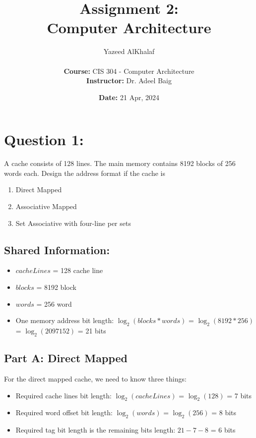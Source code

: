 \documentclass[a4paper]{article}
\title{\textbf{Assignment 2:\\Computer Architecture}}
\author{
    Yazeed AlKhalaf\\
    \\
    \textbf{Course:} CIS 304 - Computer Architecture\\
    \textbf{Instructor:} Dr. Adeel Baig
}
\date{\textbf{Date:} 21 Apr, 2024}
\begin{document}
\maketitle

\newpage

\tableofcontents

\newpage

\section{Question 1:}

A cache consists of 128 lines. The main memory contains 8192 blocks of 256
words each. Design the address format if the cache is

\begin{enumerate}[label=(\alph*)]
    \item Direct Mapped
    \item Associative Mapped
    \item Set Associative with four-line per sets
\end{enumerate}

\subsection{Shared Information:}

\begin{itemize}
    \item $cacheLines$ = 128 cache line
    \item $blocks$ = 8192 block
    \item $words$ = 256 word
    \item One memory address bit length: $\log_2(blocks * words)$ = $\log_2(8192*256)$ = $\log_2(2097152)$ = 21 bits
\end{itemize}

\subsection{Part A: Direct Mapped}

For the direct mapped cache, we need to know three things:

\begin{itemize}
    \item Required cache lines bit length: $\log_2(cacheLines)$ = $\log_2(128)$ = 7 bits
    \item Required word offset bit length: $\log_2(words)$ = $\log_2(256)$ = 8 bits
    \item Required tag bit length is the remaining bits length: $21 - 7 - 8$ = 6 bits
\end{itemize}
\end{document}
